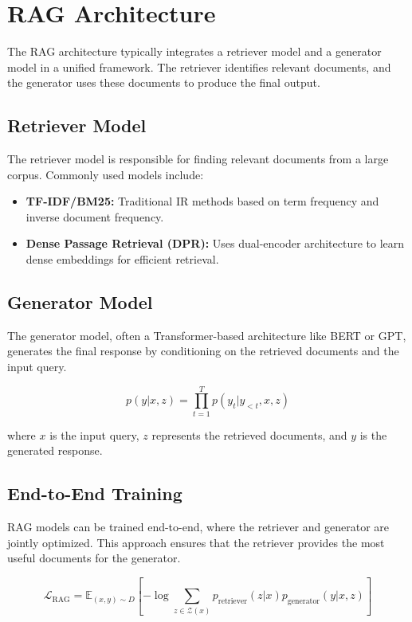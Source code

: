 \section{RAG Architecture}
The RAG architecture typically integrates a retriever model and a generator model in a unified framework. The retriever identifies relevant documents, and the generator uses these documents to produce the final output.

\subsection{Retriever Model}
The retriever model is responsible for finding relevant documents from a large corpus. Commonly used models include:
\begin{itemize}
    \item \textbf{TF-IDF/BM25:} Traditional IR methods based on term frequency and inverse document frequency.
    \item \textbf{Dense Passage Retrieval (DPR):} Uses dual-encoder architecture to learn dense embeddings for efficient retrieval.
\end{itemize}

\subsection{Generator Model}
The generator model, often a Transformer-based architecture like BERT or GPT, generates the final response by conditioning on the retrieved documents and the input query.

\begin{equation}
p(y|x, z) = \prod_{t=1}^T p(y_t | y_{<t}, x, z)
\end{equation}

where \( x \) is the input query, \( z \) represents the retrieved documents, and \( y \) is the generated response.

\subsection{End-to-End Training}
RAG models can be trained end-to-end, where the retriever and generator are jointly optimized. This approach ensures that the retriever provides the most useful documents for the generator.

\begin{equation}
\mathcal{L}_{\text{RAG}} = \mathbb{E}_{(x, y) \sim D} \left[ -\log \sum_{z \in \mathcal{Z}(x)} p_{\text{retriever}}(z|x) p_{\text{generator}}(y|x, z) \right]
\end{equation}

